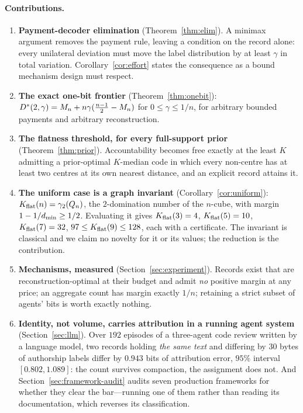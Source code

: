 \paragraph{Contributions.}
\begin{enumerate}
\item \textbf{Payment-decoder elimination} (Theorem~\ref{thm:elim}). A minimax
      argument removes the payment rule, leaving a condition on the record alone:
      every unilateral deviation must move the label distribution by at least
      $\gamma$ in total variation. Corollary~\ref{cor:effort} states the
      consequence as a bound mechanism design must respect.
\item \textbf{The exact one-bit frontier} (Theorem~\ref{thm:onebit}):
      $D^\ast(2,\gamma) = M_n + n\gamma(\frac{n-1}{2} - M_n)$ for
      $0 \le \gamma \le 1/n$, for arbitrary bounded payments and arbitrary
      reconstruction.
\item \textbf{The flatness threshold, for every full-support prior}
      (Theorem~\ref{thm:prior}). Accountability becomes free exactly at the least
      $K$ admitting a prior-optimal $K$-median code in which every non-centre has
      at least two centres at its own nearest distance, and an explicit record
      attains it.
\item \textbf{The uniform case is a graph invariant}
      (Corollary~\ref{cor:uniform}): $K_{\mathrm{flat}}(n) = \gamma_2(Q_n)$, the
      $2$-domination number of the $n$-cube, with margin
      $1 - 1/d_{\min} \ge 1/2$. Evaluating it gives $K_{\mathrm{flat}}(3)=4$, $K_{\mathrm{flat}}(5)=10$,
      $K_{\mathrm{flat}}(7)=32$, $97 \le K_{\mathrm{flat}}(9) \le 128$, each with a certificate. The
      invariant is classical and we claim no novelty for it or its values; the
      reduction is the contribution.
\item \textbf{Mechanisms, measured} (Section~\ref{sec:experiment}). Records
      exist that are reconstruction-optimal at their budget and admit \emph{no}
      positive margin at any price; an aggregate count has margin exactly $1/n$;
      retaining a strict subset of agents' bits is worth exactly nothing.
\item \textbf{Identity, not volume, carries attribution in a running agent
      system} (Section~\ref{sec:llm}). Over $192$ episodes of a three-agent
      code review written by a language model, two records holding \emph{the
      same text} and differing by $30$ bytes of authorship labels differ by
      $0.943$ bits of attribution error, $95\%$ interval $[0.802, 1.089]$: the
      count survives compaction, the assignment does not. And
      Section~\ref{sec:framework-audit} audits seven production frameworks for
      whether they clear the bar---running one of them rather than reading its
      documentation, which reverses its classification.
\end{enumerate}

